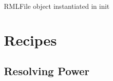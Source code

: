 \documentclass[letterpaper,10pt,english]{sphinxmanual}
\begin{document}
\begin{fulllineitems}
\begin{fulllineitems}
\end{fulllineitems}


\begin{fulllineitems}
\label{\detokenize{API:raypyng.simulate.SimulationParams.rml}}
\pysigstartsignatures
{}
\pysigstopsignatures
\sphinxAtStartPar
RMLFile object instantiated in init

\end{fulllineitems}


\end{fulllineitems}



\section{Recipes}
\label{\detokenize{API:recipes}}

\subsection{Resolving Power}
\label{\detokenize{API:resolving-power}}
\end{document}
